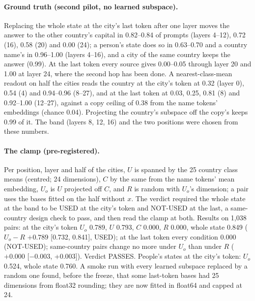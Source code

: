 \documentclass{article}
\begin{document}
\paragraph{Ground truth (second pilot, no learned subspace).} Replacing the whole state at the city's last token after one layer moves the answer to the other country's capital in 0.82--0.84 of prompts (layers 4--12), 0.72 (16), 0.58 (20) and 0.00 (24); a person's state does so in 0.63--0.70 and a country name's in 0.96--1.00 (layers 4--16), and a city of the same country keeps the answer (0.99). At the last token every source gives 0.00--0.05 through layer 20 and 1.00 at layer 24, where the second hop has been done. A nearest-class-mean readout on half the cities reads the country at the city's token at 0.32 (layer 0), 0.54 (4) and 0.94--0.96 (8--27), and at the last token at 0.03, 0.25, 0.81 (8) and 0.92--1.00 (12--27), against a copy ceiling of 0.38 from the name tokens' embeddings (chance 0.04). Projecting the country's subspace off the copy's keeps 0.99 of it. The band (layers 8, 12, 16) and the two positions were chosen from these numbers.

\paragraph{The clamp (pre-registered).} Per position, layer and half of the cities, $U$ is spanned by the 25 country class means (centred; 24 dimensions), $C$ by the same from the name tokens' mean embedding, $U_o$ is $U$ projected off $C$, and $R$ is random with $U_o$'s dimension; a pair uses the bases fitted on the half without $x$. The verdict required the whole state at the band to be USED at the city's token and NOT-USED at the last, a same-country design check to pass, and then read the clamp at both. Results on 1,038 pairs: at the city's token $U_o$ 0.789, $U$ 0.793, $C$ 0.000, $R$ 0.000, whole state 0.849 ($U_o - R$ $+0.789$ [0.732, 0.841], USED); at the last token every condition 0.000 (NOT-USED); same-country pairs change no more under $U_o$ than under $R$ ($+0.000$ [$-0.003$, +0.003]). Verdict PASSES. People's states at the city's token: $U_o$ 0.524, whole state 0.760. A smoke run with every learned subspace replaced by a random one found, before the freeze, that some last-token bases had 25 dimensions from float32 rounding; they are now fitted in float64 and capped at 24.
\end{document}
